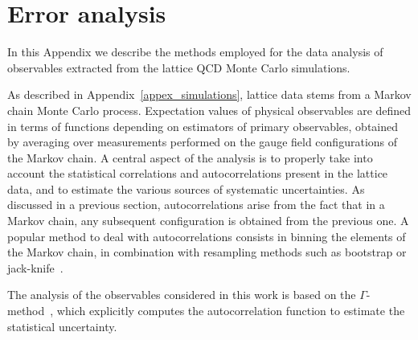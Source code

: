 
\chapter{Error analysis}
\label{appex_errors}

In this Appendix we describe the methods employed for the data analysis of
observables extracted
from the lattice QCD Monte Carlo simulations.

As described in Appendix~\ref{appex_simulations}, lattice data stems from a Markov chain Monte Carlo process. Expectation values of physical observables are defined in terms of functions depending on estimators of primary observables, obtained by averaging over measurements performed on the gauge field configurations of the Markov chain. A central aspect of the analysis is to properly take into account the statistical correlations and autocorrelations present in the lattice data, and to estimate the various sources of systematic uncertainties. As discussed in a previous section, autocorrelations arise from the fact that in a Markov chain, any subsequent configuration is obtained from the previous one. A popular method to deal with autocorrelations consists in binning the elements of the Markov chain, in combination with resampling methods such as bootstrap or jack-knife~\citep{doi:10.1137/1.9781611970319,Efron:1986hys,10.1093/biomet/61.1.1}.

The analysis of the observables considered in this work is based on the $\Gamma$-method~\citep{Wolff:2003sm,Schaefer:2010hu,Ramos:2018vgu}, which explicitly computes the autocorrelation function to estimate the statistical uncertainty.


